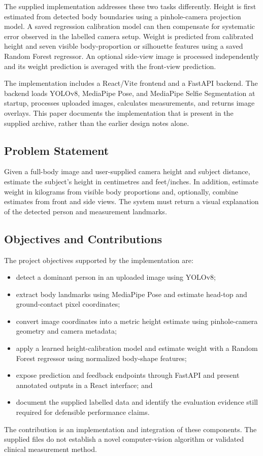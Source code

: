 \documentclass[conference]{IEEEtran}
\begin{document}
The supplied implementation addresses these two tasks differently. Height is first estimated from detected body boundaries using a pinhole-camera projection model. A saved regression calibration model can then compensate for systematic error observed in the labelled camera setup. Weight is predicted from calibrated height and seven visible body-proportion or silhouette features using a saved Random Forest regressor. An optional side-view image is processed independently and its weight prediction is averaged with the front-view prediction.

The implementation includes a React/Vite frontend and a FastAPI backend. The backend loads YOLOv8, MediaPipe Pose, and MediaPipe Selfie Segmentation at startup, processes uploaded images, calculates measurements, and returns image overlays. This paper documents the implementation that is present in the supplied archive, rather than the earlier design notes alone.

\subsection{Problem Statement}
Given a full-body image and user-supplied camera height and subject distance, estimate the subject's height in centimetres and feet/inches. In addition, estimate weight in kilograms from visible body proportions and, optionally, combine estimates from front and side views. The system must return a visual explanation of the detected person and measurement landmarks.

\subsection{Objectives and Contributions}
The project objectives supported by the implementation are:
\begin{itemize}
  \item detect a dominant person in an uploaded image using YOLOv8;
  \item extract body landmarks using MediaPipe Pose and estimate head-top and ground-contact pixel coordinates;
  \item convert image coordinates into a metric height estimate using pinhole-camera geometry and camera metadata;
  \item apply a learned height-calibration model and estimate weight with a Random Forest regressor using normalized body-shape features;
  \item expose prediction and feedback endpoints through FastAPI and present annotated outputs in a React interface; and
  \item document the supplied labelled data and identify the evaluation evidence still required for defensible performance claims.
\end{itemize}
The contribution is an implementation and integration of these components. The supplied files do not establish a novel computer-vision algorithm or validated clinical measurement method.
\end{document}
